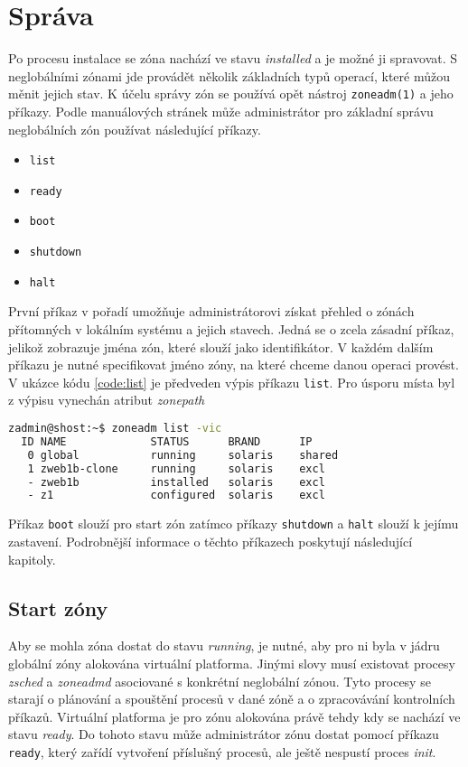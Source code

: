 \section{Správa}
\label{chapter:zones:management}
Po procesu instalace se zóna nachází ve stavu \textit{installed} a je možné ji spravovat. S neglobálními zónami jde provádět
několik základních typů operací, které můžou měnit jejich stav. K účelu správy zón se používá opět nástroj \verb|zoneadm(1)|
a jeho příkazy. Podle manuálových stránek \cite{oracle:manpages:zoneadm} může administrátor pro základní správu neglobálních
zón používat následující příkazy.
\begin{itemize}
 \item \verb|list|
 \item \verb|ready|
 \item \verb|boot|
 \item \verb|shutdown|
 \item \verb|halt|
\end{itemize}
První příkaz v pořadí umožňuje administrátorovi získat přehled o zónách přítomných v lokálním systému a jejich stavech. Jedná
se o zcela zásadní příkaz, jelikož zobrazuje jména zón, které slouží jako identifikátor. V každém dalším příkazu je nutné 
specifikovat jméno zóny, na které chceme danou operaci provést. V ukázce kódu \ref{code:list} je předveden výpis příkazu
\verb|list|. Pro úsporu místa byl z výpisu vynechán atribut \textit{zonepath}
\begin{lstlisting}[language=bash, caption={Výpis příkazu zoneadm list}, label={code:list}]
zadmin@shost:~$ zoneadm list -vic
  ID NAME             STATUS      BRAND      IP    
   0 global           running     solaris    shared
   1 zweb1b-clone     running     solaris    excl     
   - zweb1b           installed   solaris    excl  
   - z1               configured  solaris    excl  
\end{lstlisting}

Příkaz \verb|boot| slouží pro start zón zatímco příkazy \verb|shutdown| a \verb|halt| slouží k jejímu zastavení. Podrobnější
informace o těchto příkazech poskytují následující kapitoly.
\subsection{Start zóny}
\label{chapter:zones:management:start}
Aby se mohla zóna dostat do stavu \textit{running}, je nutné, aby pro ni byla v jádru globální zóny alokována virtuální platforma.
Jinými slovy musí existovat procesy \textit{zsched} a \textit{zoneadmd} asociované s konkrétní neglobální zónou. Tyto procesy
se starají o plánování a spouštění procesů v dané zóně a o zpracovávání kontrolních příkazů. Virtuální platforma je pro zónu
alokována právě tehdy kdy se nachází ve stavu \textit{ready}. Do tohoto stavu může administrátor zónu dostat pomocí příkazu 
\verb|ready|, který zařídí vytvoření příslušný procesů, ale ještě nespustí proces \textit{init}.

